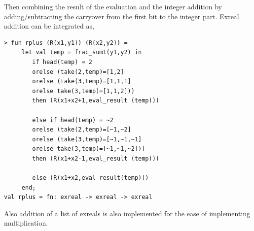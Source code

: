 \documentclass[12pt,twoside,notitlepage]{report}
\begin{document}
Then combining the result of the evaluation and the integer addition by adding/subtracting the carryover from the first bit to the integer part. Exreal addition can be integrated as,

{
\begin{verbatim}
> fun rplus (R(x1,y1)) (R(x2,y2)) = 
     let val temp = frac_sum1(y1,y2) in 
        if head(temp) = 2 
        orelse (take(2,temp)=[1,2] 
        orelse (take(3,temp)=[1,1,1] 
        orelse take(3,temp)=[1,1,2])) 
        then (R(x1+x2+1,eval_result (temp)))
   
        else if head(temp) = ~2 
        orelse (take(2,temp)=[~1,~2] 
        orelse (take(3,temp)=[~1,~1,~1] 
        orelse take(3,temp)=[~1,~1,~2])) 
        then (R(x1+x2-1,eval_result (temp)))
   
        else (R(x1+x2,eval_result(temp)))
     end;
val rplus = fn: exreal -> exreal -> exreal
\end{verbatim}
}

Also addition of a list of exreals is also implemented for the ease of implementing multiplication.
\end{document}
